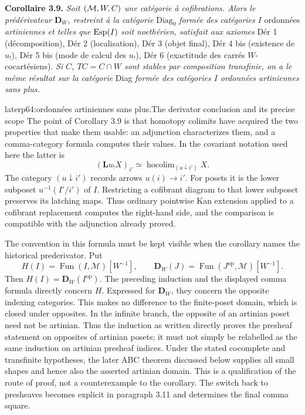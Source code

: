 \textbf{Corollaire 3.9.} \textit{Soit $(\mathcal{M},W,C)$ une catégorie à cofibrations. Alors le prédérivateur $\mathbf{D}_W$, restreint à la catégorie} $\mathrm{Diag}_0$ \textit{formée des catégories $I$} ordonnées \textit{artiniennes et telles que} $\operatorname{Esp}(I)$ \textit{soit noethérien, satisfait aux axiomes} Dér 1 (décomposition), Dér 2 (localisation), Dér 3 (objet final), Dér 4 bis (existence de $u_!$), Dér 5 bis (mode de calcul des $u_!$), Dér 6 (exactitude des carrés $W$-cocartésiens). \textit{Si $C$, $TC = C\cap W$ sont stables par composition transfinie, on a le même résultat sur la catégorie} Diag \textit{formée des catégories $I$ ordonnées artiniennes sans plus.}

\begin{dcomment}{later}{p64:ordonnées artiniennes sans plus.}{The derivator conclusion and its precise scope}
The point of Corollary 3.9 is that homotopy colimits have acquired the two properties that make them usable: an adjunction characterizes them, and a comma-category formula computes their values. In the covariant notation used here the latter is
\[
 (\mathbf L u_!X)_{i'}\simeq
 \operatorname{hocolim}_{(u\downarrow i')}X.
\]
The category $(u\downarrow i')$ records arrows $u(i)\to i'$. For posets it is the lower subposet $u^{-1}(I'/i')$ of $I$. Restricting a cofibrant diagram to that lower subposet preserves its latching maps. Thus ordinary pointwise Kan extension applied to a cofibrant replacement computes the right-hand side, and the comparison is compatible with the adjunction already proved.

The convention in this formula must be kept visible when the corollary names the historical prederivator. Put
\[
 H(I)=\operatorname{Fun}(I,\mathcal M)[W^{-1}],
 \qquad
 \mathbf D_W(J)=\operatorname{Fun}(J^{\mathrm{op}},\mathcal M)[W^{-1}].
\]
Then $H(I)=\mathbf D_W(I^{\mathrm{op}})$. The preceding induction and the displayed comma formula directly concern $H$. Expressed for $\mathbf D_W$, they concern the opposite indexing categories. This makes no difference to the finite-poset domain, which is closed under opposites. In the infinite branch, the opposite of an artinian poset need not be artinian. Thus the induction as written directly proves the presheaf statement on opposites of artinian posets; it must not simply be relabelled as the same induction on artinian presheaf indices. Under the stated cocomplete and transfinite hypotheses, the later ABC theorem discussed below supplies all small shapes and hence also the asserted artinian domain. This is a qualification of the route of proof, not a counterexample to the corollary. The switch back to presheaves becomes explicit in paragraph 3.11 and determines the final comma square.


\end{dcomment}
